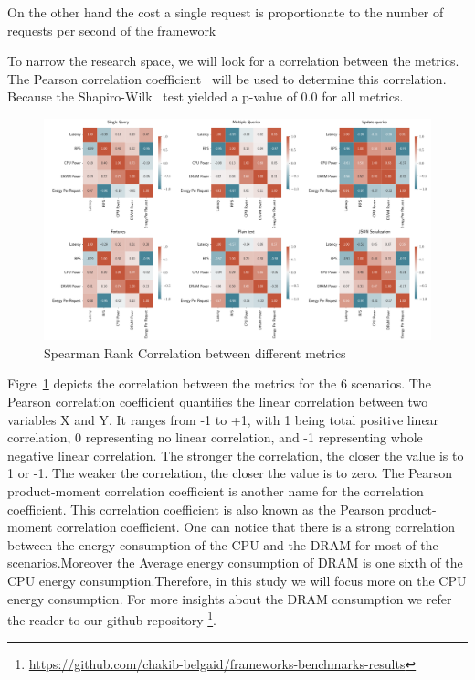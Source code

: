 On the other hand the cost a single request is proportionate to the number of requests per second of the framework

To narrow the research space, we will look for a correlation between the metrics. The Pearson correlation coefficient~\cite{zar2005spearman} will be used to determine this correlation. Because the Shapiro-Wilk~\cite{shapiro1968comparative} test yielded a p-value of 0.0 for all metrics.
\begin{figure}[htb]
    \centering
    \includegraphics[width=1.0\columnwidth]{imgs/correlation_all}
    \caption{Spearman Rank Correlation between different metrics}
    \label{fig:correlation}
\end{figure}

Figre~\ref{fig:correlation} depicts the correlation between the metrics for the 6 scenarios. The Pearson correlation coefficient quantifies the linear correlation between two variables X and Y. It ranges from -1 to +1, with 1 being total positive linear correlation, 0 representing no linear correlation, and -1 representing whole negative linear correlation. The stronger the correlation, the closer the value is to 1 or -1. The weaker the correlation, the closer the value is to zero. The Pearson product-moment correlation coefficient is another name for the correlation coefficient. This correlation coefficient is also known as the Pearson product-moment correlation coefficient.
One can notice that there is a strong correlation between the energy consumption of the CPU  and the DRAM for most of the scenarios.Moreover the Average energy consumption of DRAM is one sixth of the CPU energy consumption.Therefore, in this study we will focus more on the CPU energy consumption.
For more insights about the DRAM consumption we refer the reader to our github repository \footnote{\url{https://github.com/chakib-belgaid/frameworks-benchmarks-results}}.

